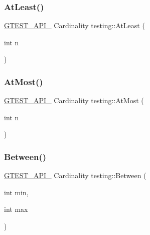 \mbox{\label{namespacetesting_a137297cb3c582843989fbd937cf0fed2}} 
\subsubsection{\texorpdfstring{AtLeast()}{AtLeast()}}
{\footnotesize\ttfamily \mbox{\hyperlink{gtest-port_8h_aa73be6f0ba4a7456180a94904ce17790}{G\+T\+E\+S\+T\+\_\+\+A\+P\+I\+\_\+}} Cardinality testing\+::\+At\+Least (\begin{DoxyParamCaption}\item[{int}]{n }\end{DoxyParamCaption})}

\mbox{\label{namespacetesting_a5487cd1068c78821ced96fbf542a91bb}} 
\subsubsection{\texorpdfstring{AtMost()}{AtMost()}}
{\footnotesize\ttfamily \mbox{\hyperlink{gtest-port_8h_aa73be6f0ba4a7456180a94904ce17790}{G\+T\+E\+S\+T\+\_\+\+A\+P\+I\+\_\+}} Cardinality testing\+::\+At\+Most (\begin{DoxyParamCaption}\item[{int}]{n }\end{DoxyParamCaption})}

\mbox{\label{namespacetesting_a3bb2d3cdd3fdf5b4be1480fce549918e}} 
\subsubsection{\texorpdfstring{Between()}{Between()}}
{\footnotesize\ttfamily \mbox{\hyperlink{gtest-port_8h_aa73be6f0ba4a7456180a94904ce17790}{G\+T\+E\+S\+T\+\_\+\+A\+P\+I\+\_\+}} Cardinality testing\+::\+Between (\begin{DoxyParamCaption}\item[{int}]{min,  }\item[{int}]{max }\end{DoxyParamCaption})}

\mbox{\label{namespacetesting_aa9f9150ed43f949c8a6bacf3f04c03ce}} 
